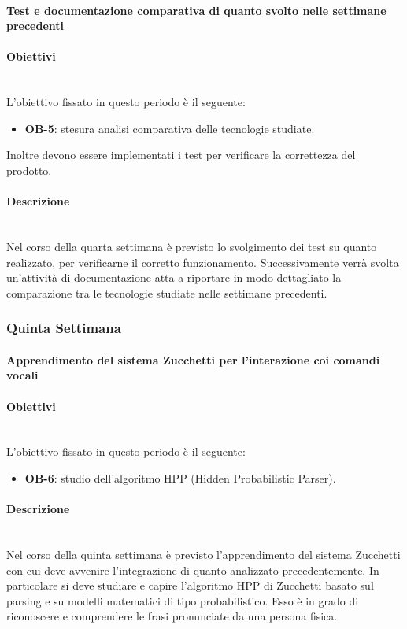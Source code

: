 {    	\paragraph{Test e documentazione comparativa di quanto svolto nelle settimane precedenti}
    	\paragraph*{Obiettivi} \mbox{}\\ [1mm]
    	L'obiettivo fissato in questo periodo è il seguente:
        \begin{itemize}
            \item \textbf{OB-5}: stesura analisi comparativa delle tecnologie studiate.
        \end{itemize}
    	Inoltre devono essere implementati i test per verificare la correttezza del prodotto.
	    \paragraph*{Descrizione} \mbox{}\\ [1mm]
    	Nel corso della quarta settimana è previsto lo svolgimento dei test su quanto realizzato, per verificarne il corretto funzionamento. Successivamente verrà svolta un'attività di documentazione atta a riportare in modo dettagliato la comparazione tra le tecnologie studiate nelle settimane precedenti.
    \subsubsection{Quinta Settimana}
    	\paragraph{Apprendimento del sistema Zucchetti per l'interazione coi comandi vocali}
    	\paragraph*{Obiettivi} \mbox{}\\ [1mm]
    	L'obiettivo fissato in questo periodo è il seguente:
        \begin{itemize}
            \item \textbf{OB-6}: studio dell'algoritmo HPP (Hidden Probabilistic Parser).
        \end{itemize}
	    \paragraph*{Descrizione} \mbox{}\\ [1mm]
    	Nel corso della quinta settimana è previsto l'apprendimento del sistema Zucchetti con cui deve avvenire l'integrazione di quanto analizzato precedentemente. In particolare si deve studiare e capire l'algoritmo HPP di Zucchetti basato sul parsing e su modelli matematici di tipo probabilistico. Esso è in grado di riconoscere e comprendere le frasi pronunciate da una persona fisica.
}
